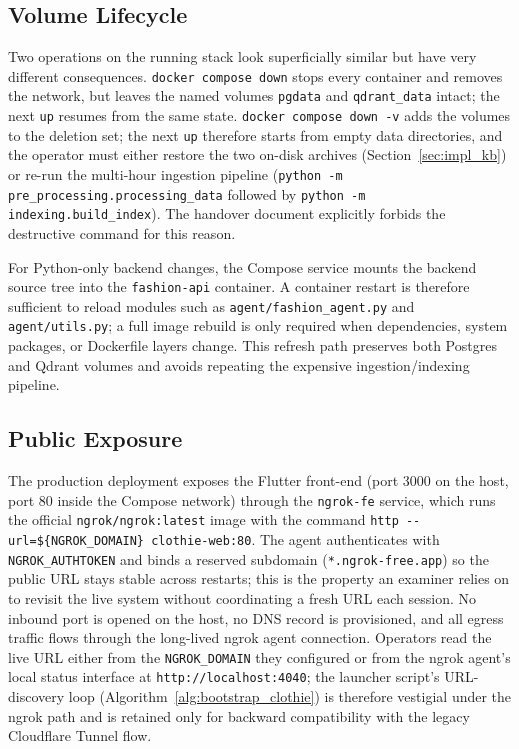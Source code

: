\subsection{Volume Lifecycle}

Two operations on the running stack look superficially similar but have very different consequences. \texttt{docker compose down} stops every container and removes the network, but leaves the named volumes \texttt{pgdata} and \texttt{qdrant\_data} intact; the next \texttt{up} resumes from the same state. \texttt{docker compose down -v} adds the volumes to the deletion set; the next \texttt{up} therefore starts from empty data directories, and the operator must either restore the two on-disk archives (Section~\ref{sec:impl_kb}) or re-run the multi-hour ingestion pipeline (\texttt{python -m pre\_processing.processing\_data} followed by \texttt{python -m indexing.build\_index}). The handover document explicitly forbids the destructive command for this reason.

For Python-only backend changes, the Compose service mounts the backend source tree into the \texttt{fashion-api} container. A container restart is therefore sufficient to reload modules such as \texttt{agent/fashion\_agent.py} and \texttt{agent/utils.py}; a full image rebuild is only required when dependencies, system packages, or Dockerfile layers change. This refresh path preserves both Postgres and Qdrant volumes and avoids repeating the expensive ingestion/indexing pipeline.

\subsection{Public Exposure}

The production deployment exposes the Flutter front-end (port 3000 on the host, port 80 inside the Compose network) through the \texttt{ngrok-fe} service, which runs the official \texttt{ngrok/ngrok:latest} image with the command \texttt{http -{}-url=\$\{NGROK\_DOMAIN\} clothie-web:80}. The agent authenticates with \texttt{NGROK\_AUTHTOKEN} and binds a reserved subdomain (\texttt{*.ngrok-free.app}) so the public URL stays stable across restarts; this is the property an examiner relies on to revisit the live system without coordinating a fresh URL each session. No inbound port is opened on the host, no DNS record is provisioned, and all egress traffic flows through the long-lived ngrok agent connection. Operators read the live URL either from the \texttt{NGROK\_DOMAIN} they configured or from the ngrok agent's local status interface at \texttt{http://localhost:4040}; the launcher script's URL-discovery loop (Algorithm~\ref{alg:bootstrap_clothie}) is therefore vestigial under the ngrok path and is retained only for backward compatibility with the legacy Cloudflare Tunnel flow.